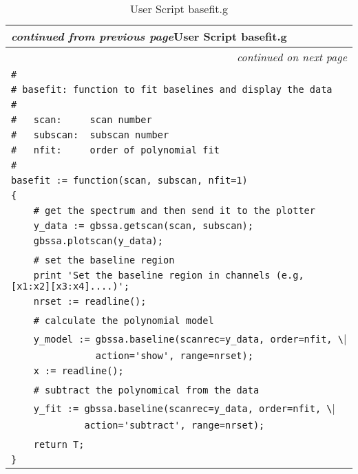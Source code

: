 \setlongtables
\begin{longtable}[c]{|l|}
\caption{User Script basefit.g}\label{base} \\
\cline{1-1}
\endfirsthead
\multicolumn{1}{l}{\hspace{9mm}\footnotesize{\slshape
 continued from previous page}\hfill{User Script basefit.g}} \\
\cline{1-1}
\endhead
\cline{1-1}
\multicolumn{1}{r}{\small \slshape
 continued on next page} \\
\endfoot
\cline{1-1}
\endlastfoot
{\slshape\small}
\verb|#| \\
\verb|# basefit: function to fit baselines and display the data| \\
\verb|#   | \\
\verb|#   scan:     scan number| \\
\verb|#   subscan:  subscan number| \\
\verb|#   nfit:     order of polynomial fit| \\
\verb|#| \\
\verb|basefit := function(scan, subscan, nfit=1)| \\
\verb|{| \\
\verb|    # get the spectrum and then send it to the plotter| \\
\verb|    y_data := gbssa.getscan(scan, subscan);| \\
\verb|    gbssa.plotscan(y_data);| \\
\verb|| \\
\verb|    # set the baseline region| \\
\verb|    print 'Set the baseline region in channels (e.g, [x1:x2][x3:x4]....)';| \\
\verb|    nrset := readline();| \\
\verb|| \\
\verb|    # calculate the polynomial model| \\
\verb|    y_model := gbssa.baseline(scanrec=y_data, order=nfit, \| \\
\verb|               action='show', range=nrset);| \\
\verb|    x := readline();| \\
\verb|| \\
\verb|    # subtract the polynomical from the data| \\
\verb|    y_fit := gbssa.baseline(scanrec=y_data, order=nfit, \| \\
\verb|             action='subtract', range=nrset);| \\
\verb|| \\
\verb|    return T;| \\
\verb|}| \\
\end{longtable}
